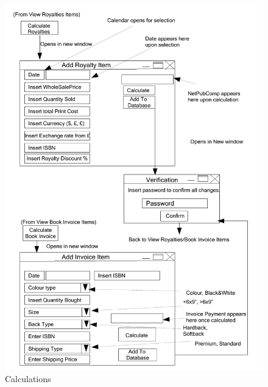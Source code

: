 \begin{figure}[H]
    \caption{Calculations} \label{Calculations.pdf}
    \includegraphics[width=\textwidth]{./Design/UserInterfaceDesign/Calculations.pdf}
\end{figure}

